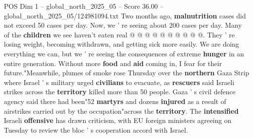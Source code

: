 \begin{textsample}{POS Dim 1 – global\_north\_2025\_05 – Score 36.00 – global\_north\_2025\_05/124981094.txt}
Two months ago, \textbf{malnutrition} cases did not exceed 50 cases per day.
Now, we ' re seeing about 200 cases per day.
Many of the \textbf{children} we see haven't eaten real @ @ @ @ @ @ @ @ @ @.
They ' re losing weight, becoming withdrawn, and getting sick more easily.
We are doing everything we can, but we ' re seeing the consequences of extreme \textbf{hunger} in an entire generation.
Without more \textbf{food} and \textbf{aid} coming in, I fear for their future."Meanwhile, plumes of smoke rose Thursday over the \textbf{northern} Gaza Strip where Israel ' s military urged \textbf{civilians} to evacuate, as \textbf{rescuers} said Israeli strikes across the \textbf{territory} killed more than 50 people.
Gaza ' s civil defence agency said there had been"52 \textbf{martyrs} and dozens \textbf{injured} as a result of airstrikes carried out by the occupation"across the \textbf{territory}.
The \textbf{intensified} Israeli \textbf{offensive} has drawn criticism, with EU foreign ministers agreeing on Tuesday to review the bloc ' s cooperation accord with Israel.

\end{textsample}

